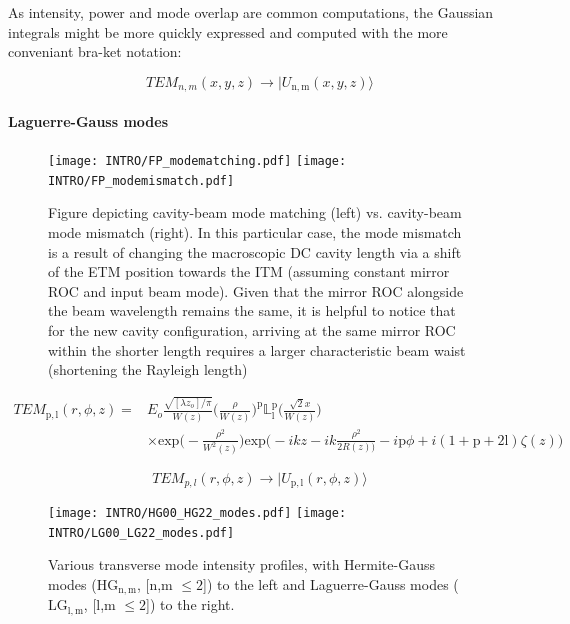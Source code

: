 As intensity, power and mode overlap are common computations, the Gaussian integrals might be more quickly expressed and computed with the more conveniant bra-ket notation:

$$TEM_{n,m}(x,y,z) \rightarrow | U_\mathrm{n,m}(x,y,z)\rangle$$

\paragraph*{Laguerre-Gauss modes}
\begin{figure}[H]
\begin{subcaptiongroup}
	\texttt{[image: INTRO/FP\_modematching.pdf]}
	\hspace{3.5mm}
	\texttt{[image: INTRO/FP\_modemismatch.pdf]}
\end{subcaptiongroup}
\hfill
\caption{Figure depicting cavity-beam mode matching (left) vs. cavity-beam mode mismatch (right). In this particular case, the mode mismatch is a result of changing the macroscopic DC cavity length via a shift of the ETM position towards the ITM (assuming constant mirror ROC and input beam mode). Given that the mirror ROC alongside the beam wavelength remains the same, it is helpful to notice that for the new cavity configuration, arriving at the same mirror ROC within the shorter length requires a larger characteristic beam waist (shortening the Rayleigh length)}
\label{fig:fp_modemismatch}
\end{figure}

\begin{equation}\label{eq:LG_beam}
	\begin{split}
	TEM_\mathrm{p,l}(r,\phi,z) = & E_o \frac{\sqrt{[\lambda z_o] / \pi}}{W(z)} \bigg(\frac{\rho}{W(z)}\bigg)^\mathrm{p}\mathbb{L}^{\mathrm{p}}_{\mathrm{l}}\bigg(\frac{\sqrt{2}x}{W(z)}\bigg)\\
				   &  \times \mathrm{exp}\bigg(-\frac{\rho^2}{W^2(z)}\bigg) \mathrm{exp}\bigg(-ikz - ik\frac{\rho^2}{2R(z))} - i\mathrm{p}\phi + i (1+\mathrm{p}+2\mathrm{l})\zeta(z)\bigg)
	\end{split}
\end{equation}

$$TEM_{p,l}(r,\phi,z) \rightarrow | U_\mathrm{p,l}(r,\phi,z)\rangle$$


\begin{figure}[h!]
  \begin{subcaptiongroup}
	  \texttt{[image: INTRO/HG00\_HG22\_modes.pdf]}
	  \hspace{3.5mm}
	  \texttt{[image: INTRO/LG00\_LG22\_modes.pdf]}
  \end{subcaptiongroup}
  \hfill
  \caption{Various transverse mode intensity profiles, with Hermite-Gauss modes ($\mathrm{HG}_\mathrm{n,m}$, [n,m \hspace{.01pt} $\leq 2$]) to the left and Laguerre-Gauss modes ($\mathrm{LG}_\mathrm{l,m}$,  [l,m \hspace{.01pt} $\leq 2$]) to the right.}
  \label{fig:HGLG_modes}
\end{figure}

